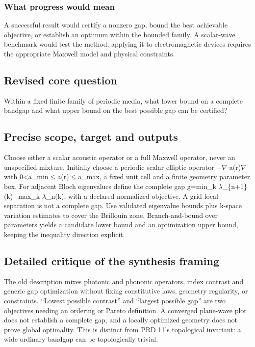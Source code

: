 \documentclass[
  11pt,
]{article}
\begin{document}
\subsubsection{What progress would mean}

A successful result would certify a nonzero gap, bound the best
achievable objective, or establish an optimum within the bounded family.
A scalar-wave benchmark would test the method; applying it to
electromagnetic devices requires the appropriate Maxwell model and
physical constraints.

\subsection{Revised core question}

Within a fixed finite family of periodic media, what lower bound on a
complete bandgap and what upper bound on the best possible gap can be
certified?

\subsection{Precise scope, target and outputs}

Choose either a scalar acoustic operator or a full Maxwell operator,
never an unspecified mixture. Initially choose a periodic scalar
elliptic operator
\ensuremath{-}\ensuremath{\nabla}\ensuremath{\cdot}a(r)\ensuremath{\nabla}
with 0<a\_min\ensuremath{\le}a(r)\ensuremath{\le}a\_max, a fixed unit
cell and a finite geometry parameter box. For adjacent Bloch eigenvalues
define the complete gap g=min\_k
\ensuremath{\lambda}\_\{n+1\}(k)\ensuremath{-}max\_k
\ensuremath{\lambda}\_n(k), with a declared normalized objective. A
grid-local separation is not a complete gap. Use validated eigenvalue
bounds plus k-space variation estimates to cover the Brillouin zone.
Branch-and-bound over parameters yields a candidate lower bound and an
optimization upper bound, keeping the inequality direction explicit.

\subsection{Detailed critique of the synthesis framing}

The old description mixes photonic and phononic operators, index
contrast and generic gap optimization without fixing constitutive laws,
geometry regularity, or constraints. ``Lowest possible contrast'' and
``largest possible gap'' are two objectives needing an ordering or
Pareto definition. A converged plane-wave plot does not establish a
complete gap, and a locally optimized geometry does not prove global
optimality. This is distinct from PRD 11's topological invariant: a wide
ordinary bandgap can be topologically trivial.
\end{document}
